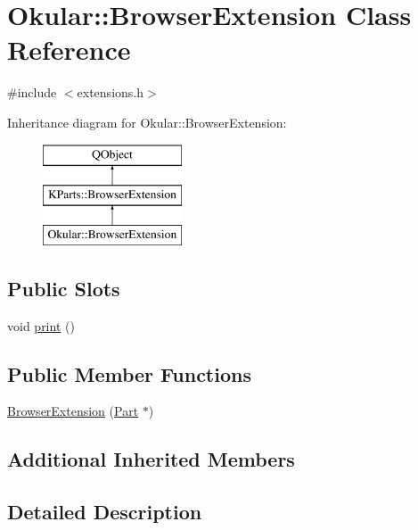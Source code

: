 \hypertarget{classOkular_1_1BrowserExtension}{\section{Okular\+:\+:Browser\+Extension Class Reference}
\label{classOkular_1_1BrowserExtension}
}


{\ttfamily \#include $<$extensions.\+h$>$}

Inheritance diagram for Okular\+:\+:Browser\+Extension\+:\begin{figure}[H]
\begin{center}
\leavevmode
\includegraphics[height=3.000000cm]{classOkular_1_1BrowserExtension}
\end{center}
\end{figure}
\subsection*{Public Slots}
\begin{DoxyCompactItemize}
\item 
void \hyperlink{classOkular_1_1BrowserExtension_a3a21564b97dcb5a78b5647c1bf524ca6}{print} ()
\end{DoxyCompactItemize}
\subsection*{Public Member Functions}
\begin{DoxyCompactItemize}
\item 
\hyperlink{classOkular_1_1BrowserExtension_a08301e2b1330f8998039f0ee5edde338}{Browser\+Extension} (\hyperlink{classOkular_1_1Part}{Part} $\ast$)
\end{DoxyCompactItemize}
\subsection*{Additional Inherited Members}


\subsection{Detailed Description}


